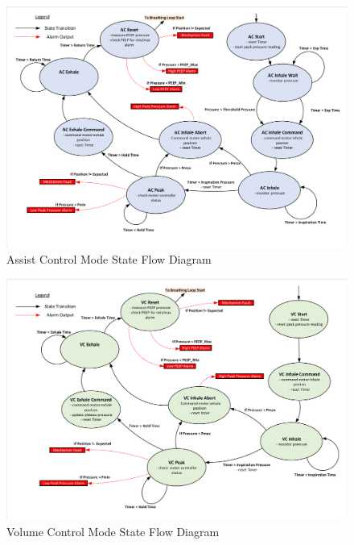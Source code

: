 \documentclass[]{article}
\begin{document}
\begin{appendices}
\begin{figure}
	\includegraphics[scale=0.8, trim = 6 6 6 6, clip]{figures/ac_mode.pdf}
	\caption{Assist Control Mode State Flow Diagram}
	\label{fig:ac_dstfd}
\end{figure}

\begin{figure}
	\includegraphics[scale=0.8, trim = 6 6 6 6, clip]{figures/vc_mode.pdf}
	\caption{Volume Control Mode State Flow Diagram}
	\label{fig:vc_dstfd}
\end{figure}


\end{appendices}
\end{document}
